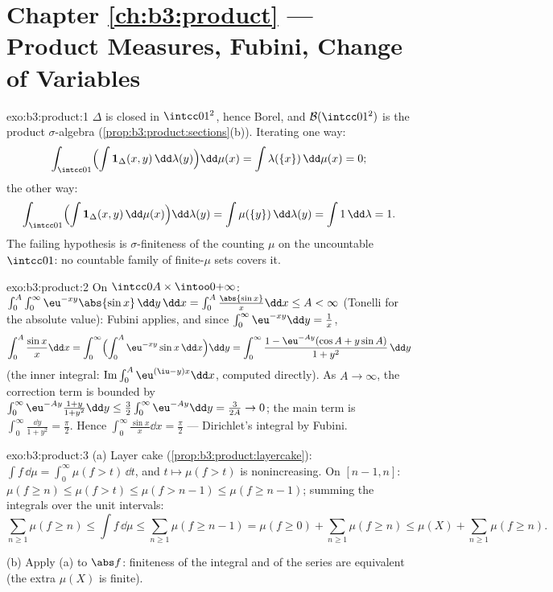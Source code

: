 \section*{Chapter \ref{ch:b3:product} --- Product Measures,
Fubini, Change of Variables}

\begin{solution}{exo:b3:product:1}
$\Delta$ is closed in $\intcc01^2$, hence Borel, and $\mathcal
B(\intcc01^2)$ is the product $\sigma$-algebra
(\cref{prop:b3:product:sections}(b)). Iterating one way:
\[
\int_{\intcc01}\Bigl(\int \mathbf 1_\Delta(x,y)
\,\dd\lambda(y)\Bigr)\dd\mu(x)
= \int \lambda(\{x\})\,\dd\mu(x) = 0 ;
\]
the other way:
\[
\int_{\intcc01}\Bigl(\int\mathbf
1_\Delta(x,y)\,\dd\mu(x)\Bigr)\dd\lambda(y)
= \int \mu(\{y\})\,\dd\lambda(y) = \int 1\,\dd\lambda = 1 .
\]
The failing hypothesis is $\sigma$-finiteness of the counting
 $\mu$ on the uncountable $\intcc01$: no countable
family of finite-$\mu$ sets covers it.
\end{solution}

\begin{solution}{exo:b3:product:2}
On $\intcc0A\times\intoo0{+\infty}$:
$\int_0^A\int_0^\infty\eu^{-xy}\abs{\sin x}\,\dd y\,\dd x =
\int_0^A\frac{\abs{\sin x}}x\dd x \leq A < \infty$ (Tonelli for
the absolute value): Fubini applies, and since
$\int_0^\infty\eu^{-xy}\dd y = \frac1x$,
\[
\int_0^A\frac{\sin x}x\dd x
= \int_0^\infty\Bigl(\int_0^A\eu^{-xy}\sin x\,\dd
x\Bigr)\dd y
= \int_0^\infty \frac{1 - \eu^{-Ay}(\cos A + y\sin A)}{1 +
y^2}\,\dd y
\]
(the inner integral: $\operatorname{Im}\int_0^A\eu^{(\iu -
y)x}\dd x$, computed directly). As $A \to \infty$, the
correction term is bounded by $\int_0^\infty\eu^{-Ay}\frac{1 +
y}{1 + y^2}\dd y \leq \frac32\int_0^\infty\eu^{-Ay}\dd y =
\frac3{2A} \to 0$; the main term is
$\int_0^\infty\frac{\dd y}{1+y^2} = \frac\pi2$. Hence
$\int_0^\infty\frac{\sin x}x\dd x = \frac\pi2$ --- Dirichlet's
integral by Fubini.
\end{solution}

\begin{solution}{exo:b3:product:3}
(a) Layer cake (\cref{prop:b3:product:layercake}): $\int
f\,\dd\mu = \int_0^\infty\mu(f > t)\,\dd t$, and $t \mapsto
\mu(f > t)$ is nonincreasing. On $[n-1, n]$: $\mu(f \geq n)
\leq \mu(f > t) \leq \mu(f > n - 1) \leq \mu(f \geq n - 1)$;
summing the integrals over the unit intervals:
\[
\sum_{n\geq1}\mu(f \geq n) \leq \int f\,\dd\mu \leq
\sum_{n\geq1}\mu(f \geq n - 1) = \mu(f \geq 0) +
\sum_{n\geq1}\mu(f\geq n) \leq \mu(X) + \sum_{n\geq1}\mu(f\geq
n).
\]

(b) Apply (a) to $\abs f$: finiteness of the integral and of
the series are equivalent (the extra $\mu(X)$ is finite).
\end{solution}

